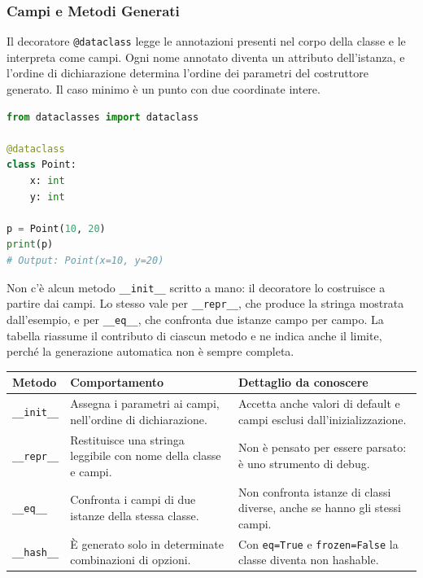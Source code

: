 \documentclass[12pt]{extarticle}
\begin{document}
\subsubsection{Campi e Metodi Generati}

\noindent Il decoratore \texttt{@dataclass} legge le annotazioni presenti nel corpo della classe e le interpreta come campi. Ogni nome annotato diventa un attributo dell'istanza, e l'ordine di dichiarazione determina l'ordine dei parametri del costruttore generato. Il caso minimo è un punto con due coordinate intere.

\begin{lstlisting}[language=Python]
from dataclasses import dataclass

@dataclass
class Point:
    x: int
    y: int

p = Point(10, 20)
print(p)
# Output: Point(x=10, y=20)
\end{lstlisting}

\noindent Non c'è alcun metodo \texttt{\_\_init\_\_} scritto a mano: il decoratore lo costruisce a partire dai campi. Lo stesso vale per \texttt{\_\_repr\_\_}, che produce la stringa mostrata dall'esempio, e per \texttt{\_\_eq\_\_}, che confronta due istanze campo per campo. La tabella riassume il contributo di ciascun metodo e ne indica anche il limite, perché la generazione automatica non è sempre completa.

\begin{center}
\small
\begin{tabular}{p{3.6cm}p{5.4cm}p{6.4cm}}
    \toprule
    \textbf{Metodo} & \textbf{Comportamento} & \textbf{Dettaglio da conoscere} \\
    \midrule
    \texttt{\_\_init\_\_} & Assegna i parametri ai campi, nell'ordine di dichiarazione. & Accetta anche valori di default e campi esclusi dall'inizializzazione. \\
    \addlinespace
    \texttt{\_\_repr\_\_} & Restituisce una stringa leggibile con nome della classe e campi. & Non è pensato per essere parsato: è uno strumento di debug. \\
    \addlinespace
    \texttt{\_\_eq\_\_} & Confronta i campi di due istanze della stessa classe. & Non confronta istanze di classi diverse, anche se hanno gli stessi campi. \\
    \addlinespace
    \texttt{\_\_hash\_\_} & È generato solo in determinate combinazioni di opzioni. & Con \texttt{eq=True} e \texttt{frozen=False} la classe diventa non hashable. \\
    \bottomrule
\end{tabular}
\end{center}
\end{document}
